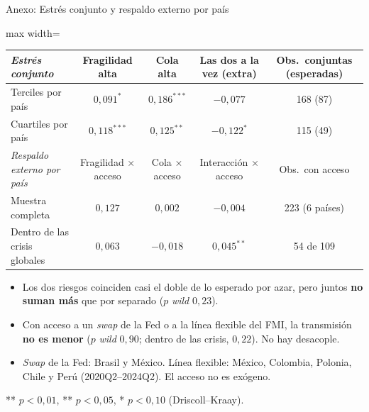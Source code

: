 \documentclass[aspectratio=169]{beamer}
\begin{document}
\begin{frame}{Anexo: Estrés conjunto y respaldo externo por país}
\centering
\footnotesize
\begin{adjustbox}{max width=\textwidth}
\begin{tabular}{l ccc c}
\toprule
\textit{Estrés conjunto} & Fragilidad alta & Cola alta & Las dos a la vez (extra) & Obs.\ conjuntas (esperadas) \\
\midrule
Terciles por país & $0{,}091^{*}$ & $0{,}186^{***}$ & $-0{,}077$ & 168 (87) \\
Cuartiles por país & $0{,}118^{***}$ & $0{,}125^{**}$ & $-0{,}122^{*}$ & 115 (49) \\
\midrule
\textit{Respaldo externo por país} & Fragilidad $\times$ acceso & Cola $\times$ acceso & Interacción $\times$ acceso & Obs.\ con acceso \\
\midrule
Muestra completa & $0{,}127$ & $0{,}002$ & $-0{,}004$ & 223 (6 países) \\
Dentro de las crisis globales & $0{,}063$ & $-0{,}018$ & $0{,}045^{**}$ & 54 de 109 \\
\bottomrule
\end{tabular}
\end{adjustbox}
\vspace{4pt}
\begin{itemize}\footnotesize
\item Los dos riesgos coinciden casi el doble de lo esperado por azar, pero juntos \textbf{no suman más} que por separado ($p$ \textit{wild} $0{,}23$).
\item Con acceso a un \textit{swap} de la Fed o a la línea flexible del FMI, la transmisión \textbf{no es menor} ($p$ \textit{wild} $0{,}90$; dentro de las crisis, $0{,}22$). No hay desacople.
\item \textit{Swap} de la Fed: Brasil y México. Línea flexible: México, Colombia, Polonia, Chile y Perú (2020Q2--2024Q2). El acceso no es exógeno.
\end{itemize}
\vspace{-2pt}
{\scriptsize *** $p<0{,}01$, ** $p<0{,}05$, * $p<0{,}10$ (Driscoll--Kraay).\par}
\end{frame}
\end{document}
